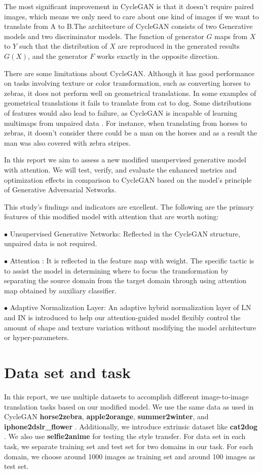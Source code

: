 \documentclass{article}
\begin{document}
The most significant improvement in CycleGAN is that it doesn't require paired images, which means we only need to care about one kind of images if we want to translate from A to B.The architecture of CycleGAN consists of two Generative models and two discriminator models. The function of generator $G$ maps from $X$ to $Y$ such that the distribution of $X$ are reproduced in the generated results $G(X)$, and the generator $F$ works exactly in the opposite direction. 

There are some limitations about CycleGAN. Although it has good performance on tasks involving texture or color transformation, such as converting horses to zebras, it does not perform well on geometrical translations. In some examples of geometrical translations it fails to translate from cat to dog. Some distributions of features would also lead to failure, as CycleGAN is incapable of learning multimaps from unpaired data \cite{Augmented_cyclegan}. For instance, when translating from horses to zebras, it doesn't consider there could be a man on the horses and as a result the man was also covered with zebra stripes\cite{intro}.

In this report we aim to assess a new modified unsupervised generative model with attention. We will test, verify, and evaluate the enhanced metrics and optimization effects in comparison to CycleGAN based on the model's principle of Generative Adversarial Networks.

This study's findings and indicators are excellent. The following are the primary features of this modified model with attention that are worth noting:

$\bullet$ Unsupervised Generative Networks: Reflected in the CycleGAN structure, unpaired data is not required.

$\bullet$ Attention \cite{Attention}: It is reflected in the feature map with weight. The specific tactic is to assist the model in determining where to focus the transformation by separating the source domain from the target domain through using attention map obtained by auxiliary classifier.

$\bullet$ Adaptive Normalization Layer: An adaptive hybrid normalization layer of LN and IN is introduced to help our attention-guided model flexibly control the amount of shape and texture variation without modifying the model architecture or hyper-parameters.

\section{Data set and task} 
In this report, we use multiple datasets to accomplish different image-to-image translation tasks based on our modified model. We use the same data as used in CycleGAN \cite{EECSB} \textbf{horse2zebra}, \textbf{apple2orange},  \textbf{summer2winter}, and \textbf{iphone2dslr\_flower} . Additionally, we introduce extrinsic dataset like \textbf{cat2dog} \cite{CvsD}. We also use \textbf{selfie2anime} for testing the style transfer. For data set in each task, we separate training set and test set for two domains in our task. For each domain, we choose around 1000 images as training set and around 100 images as test set. 
\end{document}
